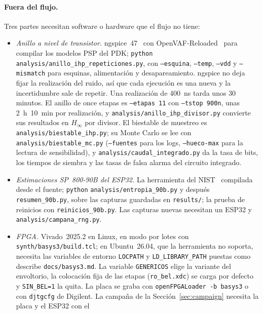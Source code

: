 \paragraph{Fuera del flujo.} Tres partes necesitan software o hardware que
el flujo no tiene:
\begin{itemize}
\item \emph{Anillo a nivel de transistor.} ngspice~47~\cite{ngspice_47} con
  OpenVAF-Reloaded~\cite{openvaf_reloaded} para compilar los modelos PSP
  del \ac{PDK}; \texttt{python} \nolinkurl{analysis/anillo_ihp_repeticiones.py}, con
  \texttt{--esquina}, \texttt{--temp}, \texttt{--vdd} y \texttt{--mismatch}
  para esquinas, alimentación y desapareamiento. ngspice no deja fijar la
  realización del ruido, así que cada ejecución es una nueva y la
  incertidumbre sale de repetir. Una realización de 400~ns tarda unos 30
  minutos. El anillo de once etapas es \texttt{--etapas 11} con
  \texttt{--tstop 900n}, unas 2~h~10~min por realización, y
  \nolinkurl{analysis/anillo_ihp_divisor.py} convierte sus resultados en
  $H_\infty$ por divisor. El biestable de muestreo es
  \nolinkurl{analysis/biestable_ihp.py}; su Monte Carlo se lee con
  \nolinkurl{analysis/biestable_mc.py} (\texttt{--fuentes} para los logs,
  \texttt{--hueco-max} para la lectura de sensibilidad), y
  \nolinkurl{analysis/caudal_integrado.py} da la tasa de bits, los tiempos
  de siembra y las tasas de falsa alarma del circuito integrado.
\item \emph{Estimaciones SP~800-90B del ESP32.} La herramienta del
  \ac{NIST}~\cite{nist_ea_github} compilada desde el fuente;
  \texttt{python} \nolinkurl{analysis/entropia_90b.py} y después
  \texttt{resumen\_90b.py}, sobre las capturas guardadas en
  \nolinkurl{results/}; la prueba de reinicios con \texttt{reinicios\_90b.py}.
  Las capturas nuevas necesitan un ESP32 y \nolinkurl{analysis/campana_rng.py}.
\item \emph{\ac{FPGA}.} Vivado~2025.2 en Linux, en modo por lotes con
  \nolinkurl{synth/basys3/build.tcl}; en Ubuntu~26.04, que la herramienta
  no soporta, necesita las variables de entorno \texttt{LOCPATH} y
  \texttt{LD\_LIBRARY\_PATH} puestas como describe
  \nolinkurl{docs/basys3.md}. La variable \texttt{GENERICOS} elige la
  variante del envoltorio, la colocación fija de las etapas
  (\texttt{ro\_bel.xdc}) se carga por defecto y \texttt{SIN\_BEL=1} la
  quita. La placa se graba con \texttt{openFPGALoader -b basys3} o con
  \texttt{djtgcfg} de Digilent. La campaña de la
  Sección~\ref{sec:campaign} necesita la placa y el ESP32 con el

\end{itemize}
